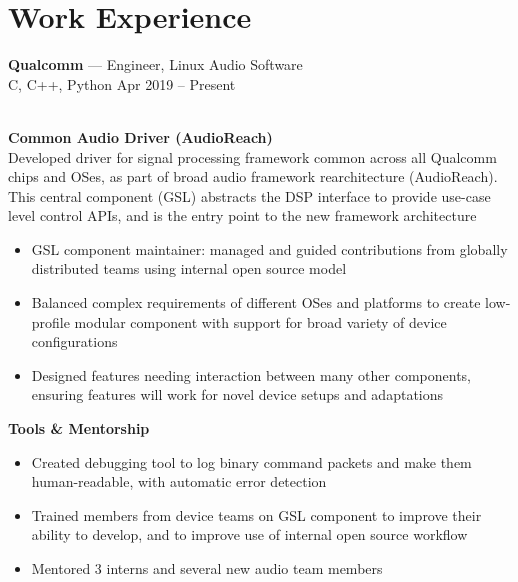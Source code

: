 \documentclass[letterpaper,10pt]{article}
\newcommand{\comment}[1]{}
\newcommand{\jobtitle}[4]{
    {\large \textbf{#1} --- #2\\}
    {\footnotesize#3 \hfill #4}
}
\begin{document}
\begin{minipage}[t]{0.6\textwidth} %


\section{Work Experience}
\medskip

\jobtitle{Qualcomm}{Engineer, Linux Audio Software}{C, C++, Python}{Apr 2019 -- Present}
\smallskip
\\
\textbf{Common Audio Driver (AudioReach)}
\\
Developed driver for signal processing framework common across all Qualcomm chips and OSes, as part of broad audio framework rearchitecture (AudioReach).
This central component (GSL) abstracts the DSP interface to provide use-case level control APIs, and is the entry point to the new framework architecture
\smallskip
\begin{itemize}
    \item {GSL component maintainer: managed and guided contributions from globally distributed teams using internal open source model}
    \item {Balanced complex requirements of different OSes and platforms to create low-profile modular component with support for broad variety of device configurations}
    \item {Designed features needing interaction between many other components, ensuring features will work for novel device setups and adaptations}
\comment{    \item {Built performant shared memory management with no memcpy and minimal mapping to support run-time application-level memory management for Android Codec 2.0} }
\comment{    \item {Created extensible error detection mechanism to recover from fatal scenarios without device restart} }
\end{itemize}

\smallskip
\textbf{Tools \& Mentorship}
\begin{itemize}
    \item {Created debugging tool to log binary command packets and make them human-readable, with automatic error detection}
    \item {Trained members from device teams on GSL component to improve their ability to develop, and to improve use of internal open source workflow}
    \item {Mentored 3 interns and several new audio team members}
    

\end{itemize}
\end{minipage}
\end{document}
